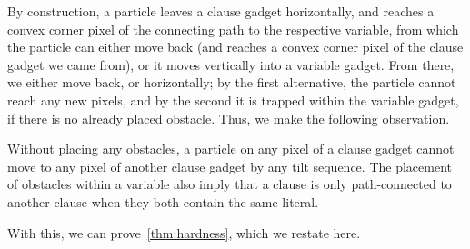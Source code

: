 \documentclass[a4paper,UKenglish,cleveref,thm-restate]{lipics-v2021}
\begin{document}
By construction, a particle leaves a clause gadget horizontally, and reaches a convex corner pixel of the connecting path to the respective variable, from which the particle can either move back (and reaches a convex corner pixel of the clause gadget we came from), or it moves vertically into a variable gadget.
From there, we either move back, or horizontally; by the first alternative, the particle cannot reach any new pixels, and by the second it is trapped within the variable gadget, if there is no already placed obstacle.
Thus, we make the following observation.

\begin{observation}
	\label{obs:clauseToClause}
	Without placing any obstacles, a particle on any pixel of a clause gadget cannot move to any pixel of another clause gadget by any tilt sequence.
	The placement of obstacles within a variable also imply that a clause is only path-connected to another clause when they both contain the same literal.
\end{observation}

With this, we can prove~\cref{thm:hardness}, which we restate here.

\tiltFillabilityHardness*
\end{document}
